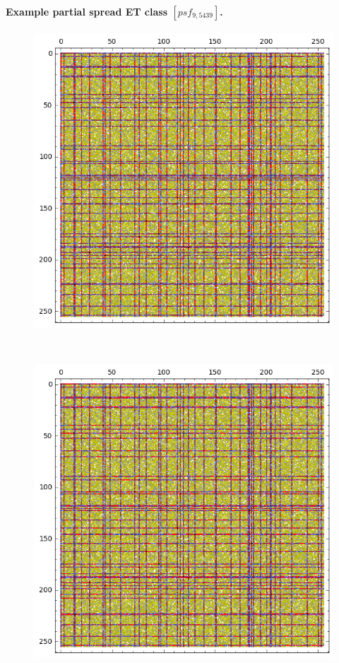 \documentclass[12pt,a4paper]{article}
\begin{document}
\paragraph*{Example partial spread ET class $[psf_{9,5439}]$.}
%
\begin{figure}[!bhpt] %
\centering
\begin{minipage}{.48\textwidth}
  \centering
  \includegraphics[width=.9\linewidth]{../matrix_plot/psf_9_5439_bent_cayley_graph_index_matrix.png}
  \label{fig:psf_9_5439_bent_cayley_graph_index_matrix}
\end{minipage}
~~
\begin{minipage}{.48\textwidth}
  \centering
  \includegraphics[width=.9\linewidth]{../matrix_plot/psf_9_5439_dual_cayley_graph_index_matrix.png}
  \label{fig:psf_9_5439_dual_cayley_graph_index_matrix}
\end{minipage}%
\end{figure}
\end{document}
